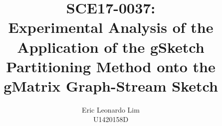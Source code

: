 \title{SCE17-0037:\\Experimental Analysis of the Application of the gSketch Partitioning Method onto the gMatrix Graph-Stream Sketch}


\author{Eric Leonardo Lim \\ U1420158D}








     



\renewcommand{\submissiontext}{Submitted in partial fulfilment of the requirements for the degree of}




\subject{Partitioning on gMatrix} 
